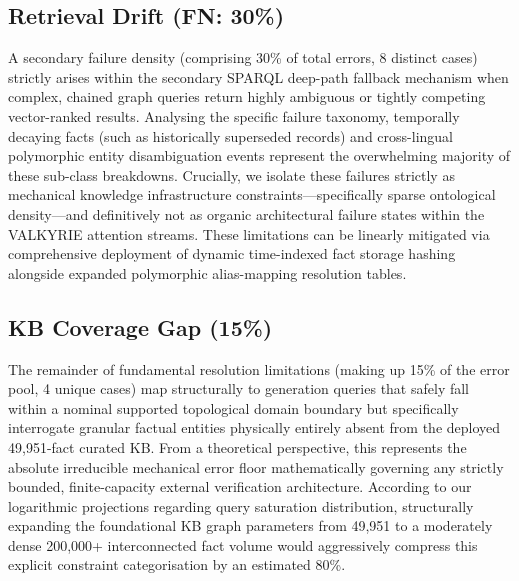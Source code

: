 \documentclass[11pt,a4paper]{article}
\begin{document}
\subsection{Retrieval Drift (FN: 30\%)}
A secondary failure density (comprising 30\% of total errors, 8 distinct cases) strictly arises within the secondary SPARQL deep-path fallback mechanism when complex, chained graph queries return highly ambiguous or tightly competing vector-ranked results. Analysing the specific failure taxonomy, temporally decaying facts (such as historically superseded records) and cross-lingual polymorphic entity disambiguation events represent the overwhelming majority of these sub-class breakdowns. Crucially, we isolate these failures strictly as mechanical knowledge infrastructure constraints---specifically sparse ontological density---and definitively not as organic architectural failure states within the VALKYRIE attention streams. These limitations can be linearly mitigated via comprehensive deployment of dynamic time-indexed fact storage hashing alongside expanded polymorphic alias-mapping resolution tables.

\subsection{KB Coverage Gap (15\%)}
The remainder of fundamental resolution limitations (making up 15\% of the error pool, 4 unique cases) map structurally to generation queries that safely fall within a nominal supported topological domain boundary but specifically interrogate granular factual entities physically entirely absent from the deployed 49,951-fact curated KB. From a theoretical perspective, this represents the absolute irreducible mechanical error floor mathematically governing any strictly bounded, finite-capacity external verification architecture. According to our logarithmic projections regarding query saturation distribution, structurally expanding the foundational KB graph parameters from 49,951 to a moderately dense 200,000+ interconnected fact volume would aggressively compress this explicit constraint categorisation by an estimated 80\%.
\end{document}
